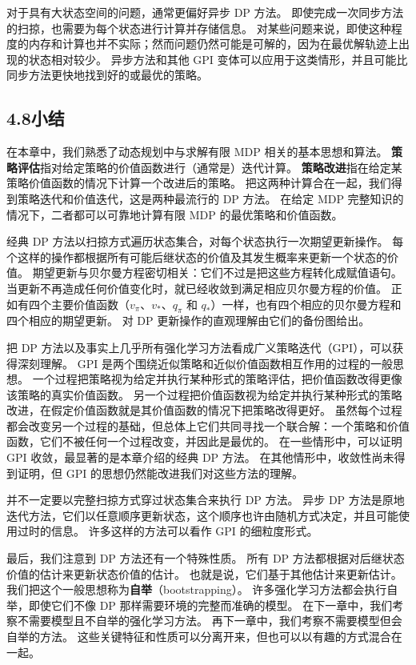 \documentclass[UTF8, 12pt, fontset=fandol, oneside]{ctexart}
\begin{document}
对于具有大状态空间的问题，通常更偏好异步 DP 方法。
即使完成一次同步方法的扫掠，也需要为每个状态进行计算并存储信息。
对某些问题来说，即使这种程度的内存和计算也并不实际；然而问题仍然可能是可解的，因为在最优解轨迹上出现的状态相对较少。
异步方法和其他 GPI 变体可以应用于这类情形，并且可能比同步方法更快地找到好的或最优的策略。

\subsection*{4.8\quad 小结}

在本章中，我们熟悉了动态规划中与求解有限 MDP 相关的基本思想和算法。
\textbf{策略评估}指对给定策略的价值函数进行（通常是）迭代计算。
\textbf{策略改进}指在给定某策略价值函数的情况下计算一个改进后的策略。
把这两种计算合在一起，我们得到策略迭代和价值迭代，这是两种最流行的 DP 方法。
在给定 MDP 完整知识的情况下，二者都可以可靠地计算有限 MDP 的最优策略和价值函数。

经典 DP 方法以扫掠方式遍历状态集合，对每个状态执行一次期望更新操作。
每个这样的操作都根据所有可能后继状态的价值及其发生概率来更新一个状态的价值。
期望更新与贝尔曼方程密切相关：它们不过是把这些方程转化成赋值语句。
当更新不再造成任何价值变化时，就已经收敛到满足相应贝尔曼方程的价值。
正如有四个主要价值函数（$v_\pi$、$v_*$、$q_\pi$ 和 $q_*$）一样，也有四个相应的贝尔曼方程和四个相应的期望更新。
对 DP 更新操作的直观理解由它们的备份图给出。

把 DP 方法以及事实上几乎所有强化学习方法看成广义策略迭代（GPI），可以获得深刻理解。
GPI 是两个围绕近似策略和近似价值函数相互作用的过程的一般思想。
一个过程把策略视为给定并执行某种形式的策略评估，把价值函数改得更像该策略的真实价值函数。
另一个过程把价值函数视为给定并执行某种形式的策略改进，在假定价值函数就是其价值函数的情况下把策略改得更好。
虽然每个过程都会改变另一个过程的基础，但总体上它们共同寻找一个联合解：一个策略和价值函数，它们不被任何一个过程改变，并因此是最优的。
在一些情形中，可以证明 GPI 收敛，最显著的是本章介绍的经典 DP 方法。
在其他情形中，收敛性尚未得到证明，但 GPI 的思想仍然能改进我们对这些方法的理解。

并不一定要以完整扫掠方式穿过状态集合来执行 DP 方法。
异步 DP 方法是原地迭代方法，它们以任意顺序更新状态，这个顺序也许由随机方式决定，并且可能使用过时的信息。
许多这样的方法可以看作 GPI 的细粒度形式。

最后，我们注意到 DP 方法还有一个特殊性质。
所有 DP 方法都根据对后继状态价值的估计来更新状态价值的估计。
也就是说，它们基于其他估计来更新估计。
我们把这个一般思想称为\textbf{自举}（bootstrapping）。
许多强化学习方法都会执行自举，即使它们不像 DP 那样需要环境的完整而准确的模型。
在下一章中，我们考察不需要模型且不自举的强化学习方法。
再下一章中，我们考察不需要模型但会自举的方法。
这些关键特征和性质可以分离开来，但也可以以有趣的方式混合在一起。
\end{document}
